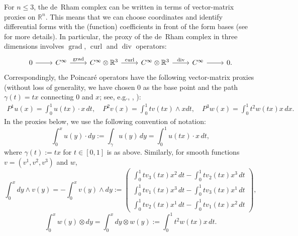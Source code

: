 \documentclass[11pt]{amsart}
\newcommand{\0}{\mathaccent23}
\newcommand\grad{\operatorname{grad}}
\renewcommand\div{\operatorname{div}}
\newcommand\curl{\operatorname{curl}}
\begin{document}
For $n\leq 3$, the de~Rham complex can be written in terms of vector-matrix proxies on $\mathbb{R}^{n}$. This means that we can choose coordinates and identify differential forms with the (function) coefficients in front of the form bases (see \cite{arnold2018finite,Arnold.D;Falk.R;Winther.R.2006a} for more details). In particular, the proxy of the de~Rham complex in three dimensions involves $\grad$, $\curl$ and $\div$ operators:
\begin{equation*} 
\begin{tikzcd}
0\arrow{r}& C^{\infty}  \arrow{r}{\grad}&C^{\infty} \otimes \mathbb{R}^{3} \arrow{r}{\curl}&C^{\infty} \otimes\mathbb{R}^{3}\arrow{r}{\div}&C^{\infty} \arrow{r}& 0. 
\end{tikzcd}
\end{equation*}
Correspondingly, the Poincar\'e operators have the following vector-matrix proxies (without loss of generality, we have chosen 0 as the base point and the path $\gamma(t)=tx$ connecting $0$ and $x$; see, e.g., \cite[(7)-(8)]{hiptmair1999canonical}, \cite[(34)]{christiansen2018generalized}):
\begin{align}\label{P-3D}
P^{1}u(x)=\int_{0}^{1}u(tx)\cdot x\,dt, \quad P^{2}v(x)=\int_{0}^{1}tv(tx)\wedge x dt, \quad P^{3}w(x)=\int_{0}^{1}t^2w(tx)x \,dx.
\end{align}
In the proxies below, we use the following convention of notation:
\begin{equation}\label{dy-dot}
\int_{0}^{x}u(y)\cdot dy:=\int_{\gamma}u(y)\,dy=\int_{0}^{1}u(tx)\cdot x\,dt,
\end{equation}
where $\gamma(t):=tx$ for $t\in [0, 1]$ is as above. Similarly, 
 for smooth functions   $v=(v^{1}, v^{2}, v^{3})$ and $w$, 
\begin{equation}\label{dy-wedge}
\int_{0}^{x}dy\wedge v(y)=-\int_{0}^{x} v(y)\wedge dy:=\left (
\begin{array}{c}
\int_{0}^{1}tv_{3}(tx)x^{2}\,dt-\int_{0}^{1}tv_{2}(tx)x^{3}\,dt\\
\int_{0}^{1}tv_{1}(tx)x^{3}\,dt-\int_{0}^{1}tv_{3}(tx)x^{1}\,dt\\
\int_{0}^{1}tv_{2}(tx)x^{1}\,dt-\int_{0}^{1}tv_{1}(tx)x^{2}\,dt
\end{array}
\right ), 
\end{equation}
\begin{equation}\label{dy-tensor}
\int_{0}^{x} w(y)\otimes dy=\int_{0}^{x}dy\otimes w(y):=\int_{0}^{1}t^2w(tx)x\,dt.
\end{equation}
\end{document}
